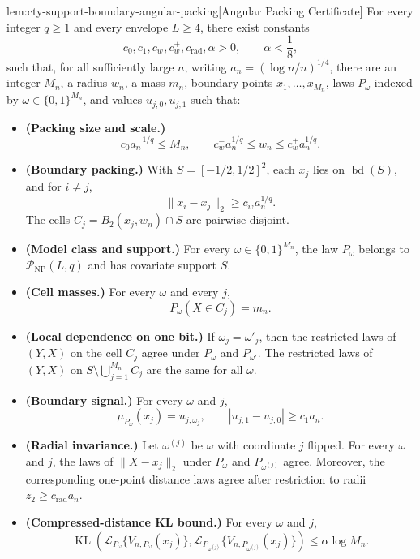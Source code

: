 \begin{lemmav}{lem:cty-support-boundary-angular-packing}[Angular Packing Certificate]
For every integer \(q\geq 1\) and every envelope \(L\geq 4\), there exist constants
\[
c_0,c_1,c_w^-,c_w^+,c_{\mathrm{rad}},\alpha>0,
\qquad \alpha<\frac18,
\]
such that, for all sufficiently large \(n\), writing \(a_n=(\log n/n)^{1/4}\), there are an integer \(M_n\), a radius \(w_n\), a mass \(m_n\), boundary points \(x_1,\ldots,x_{M_n}\), laws \(P_\omega\) indexed by \(\omega\in\{0,1\}^{M_n}\), and values \(u_{j,0},u_{j,1}\) such that:
\begin{itemize}
\item \textbf{(Packing size and scale.)}
\[
c_0 a_n^{-1/q}\leq M_n,
\qquad
c_w^- a_n^{1/q}\leq w_n\leq c_w^+ a_n^{1/q}.
\]
\item \textbf{(Boundary packing.)} With \(S=[-1/2,1/2]^2\), each \(x_j\) lies on \(\operatorname{bd}(S)\), and for \(i\neq j\),
\[
\|x_i-x_j\|_2\geq c_w^- a_n^{1/q}.
\]
The cells \(C_j=B_2(x_j,w_n)\cap S\) are pairwise disjoint.
\item \textbf{(Model class and support.)} For every \(\omega\in\{0,1\}^{M_n}\), the law \(P_\omega\) belongs to \(\mathcal P_{\mathrm{NP}}(L,q)\) and has covariate support \(S\).
\item \textbf{(Cell masses.)} For every \(\omega\) and every \(j\),
\[
P_\omega(X\in C_j)=m_n.
\]
\item \textbf{(Local dependence on one bit.)} If \(\omega_j=\omega'_j\), then the restricted laws of \((Y,X)\) on the cell \(C_j\) agree under \(P_\omega\) and \(P_{\omega'}\). The restricted laws of \((Y,X)\) on \(S\setminus\bigcup_{j=1}^{M_n}C_j\) are the same for all \(\omega\).
\item \textbf{(Boundary signal.)} For every \(\omega\) and \(j\),
\[
\mu_{P_\omega}(x_j)=u_{j,\omega_j},
\qquad
|u_{j,1}-u_{j,0}|\geq c_1 a_n.
\]
\item \textbf{(Radial invariance.)} Let \(\omega^{(j)}\) be \(\omega\) with coordinate \(j\) flipped. For every \(\omega\) and \(j\), the laws of \(\|X-x_j\|_2\) under \(P_\omega\) and \(P_{\omega^{(j)}}\) agree. Moreover, the corresponding one-point distance laws agree after restriction to radii \(z_2\geq c_{\mathrm{rad}}a_n\).
\item \textbf{(Compressed-distance KL bound.)} For every \(\omega\) and \(j\),
\[
\operatorname{KL}\!\left(
\mathcal L_{P_\omega}\{V_{n,P_\omega}(x_j)\},
\mathcal L_{P_{\omega^{(j)}}}\{V_{n,P_{\omega^{(j)}}}(x_j)\}
\right)
\leq \alpha\log M_n.
\]
\end{itemize}
\end{lemmav}

